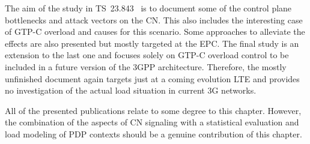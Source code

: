 The aim of the study in \gls{TS}~23.843~\cite{3gpp.23.843} is to document some of the control plane bottlenecks and attack vectors on the \gls{CN}. This also includes the interesting case of \gls{GTP-C} overload and causes for this scenario. Some approaches to alleviate the effects are also presented but mostly targeted at the \gls{EPC}. The final study is an extension to the last one \cite{3gpp.29.807} and focuses solely on \gls{GTP-C} overload control to be included in a future version of the \gls{3GPP} architecture. Therefore, the mostly unfinished document again targets just at a coming evolution \gls{LTE} and provides no investigation of the actual load situation in current \gls{3G} networks.

All of the presented publications relate to some degree to this chapter. However, the combination of the aspects of \gls{CN} signaling with a statistical evaluation and load modeling of \gls{PDP} contexts should be a genuine contribution of this chapter.



